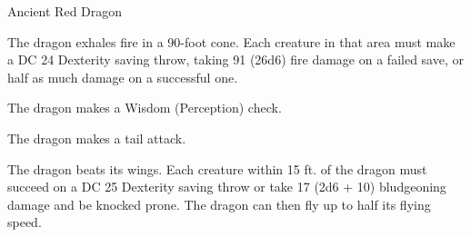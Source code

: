 \begin{monsterbox}{Ancient Red Dragon}
\begin{monsteraction}
The dragon exhales fire in a 90-foot cone. Each creature in that area must make a DC 24 Dexterity saving throw, taking 91 (26d6) fire damage on a failed save, or half as much damage on a successful one.
\end{monsteraction}
\begin{monsteraction}[Detect]
The dragon makes a Wisdom (Perception) check.
\end{monsteraction}
\begin{monsteraction}
The dragon makes a tail attack.
\end{monsteraction}
\begin{monsteraction}
The dragon beats its wings. Each creature within 15 ft. of the dragon must succeed on a DC 25 Dexterity saving throw or take 17 (2d6 + 10) bludgeoning damage and be knocked prone. The dragon can then fly up to half its flying speed.
\end{monsteraction}
\end{monsterbox}